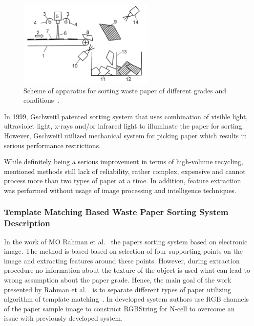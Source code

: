 \documentclass{lutmscthesis}[2010/09/22]
\begin{document}
\begin{figure}[htp]
  {\par\centering
  \includegraphics[width=0.60\textwidth]{eixelberger}
  \par}
  \caption{Scheme of apparatus for sorting waste paper
           of different grades and conditions~\cite{Eixelberger:2003}.}
  \label{afig:eixelberger}
\end{figure}

In 1999, Gschweitl \cite{Gschweitl:1999} patented sorting system that uses
combination of visible light, ultraviolet light, x-rays and/or
infrared light to illuminate the paper for sorting. However,
Gschweitl utilized mechanical system for picking paper which
results in serious performance restrictions.

While definitely being a serious improvement in terms
of high-volume recycling, mentioned methods still lack
of reliability, rather complex, expensive and cannot process
more than two types of paper at a time. In addition, feature extraction
was performed without usage of image processing and
intelligence techniques.

\subsubsection*{ Template Matching Based Waste Paper Sorting System Description }

In the work of MO Rahman et al.~\cite{Rahman:2009} the papers sorting
system based on electronic image. The method is based based on
selection of four supporting points on the image and extracting
features around these points. However, during extraction
procedure no information about the texture of the object
is used what can lead to wrong assumption about the paper
grade. Hence, the main goal of the work presented by
Rahman et al.~\cite{Rahman:2009} is to separate different
types of paper utilizing algorithm of template
matching~\cite{Pham:2003}. In developed system authors
use RGB channels of the paper sample image to
construct RGBString for N-cell to overcome an issue
with previously developed system.
\end{document}
